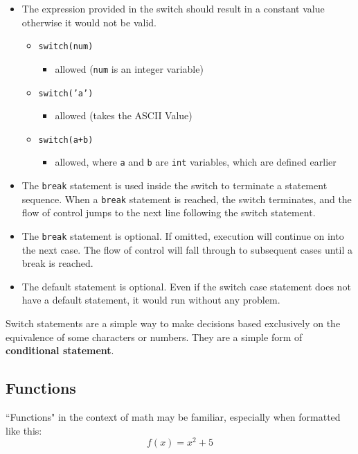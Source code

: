 \begin{itemize}
    \item The expression provided in the switch should result in a constant value otherwise it would not be valid.
    \begin{itemize}
        \item \texttt{switch(num)}
        \begin{itemize}
            \item allowed (\texttt{num} is an integer variable)
        \end{itemize}
        \item \texttt{switch('a')}
        \begin{itemize}
            \item allowed (takes the ASCII Value)
        \end{itemize}
        \item \texttt{switch(a+b)}
        \begin{itemize}
            \item allowed, where \texttt{a} and \texttt{b} are \texttt{int} variables, which are defined earlier
        \end{itemize}
    \end{itemize}
    \item The \texttt{break} statement is used inside the switch to terminate a statement sequence. When a \texttt{break} statement is reached, the switch terminates, and the flow of control jumps to the next line following the switch statement.
    \item The \texttt{break} statement is optional. If omitted, execution will continue on into the next case. The flow of control will fall through to subsequent cases until a break is reached.
    \item The default statement is optional. Even if the switch case statement does not have a default statement, it would run without any problem.
\end{itemize}

Switch statements are a simple way to make decisions based exclusively on the equivalence of some characters or numbers. They are a simple form of \textbf{conditional statement}.

\subsection{Functions}
``Functions" in the context of math may be familiar, especially when formatted like this:
$$f(x) = x^2 + 5$$

